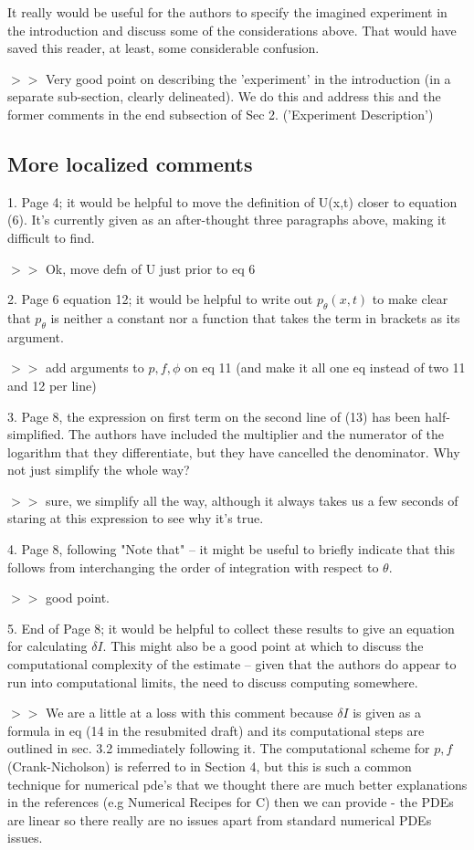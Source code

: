 \documentclass[12pt]{article}
\begin{document}
It really would be useful for the authors to specify the imagined experiment in
the introduction and discuss some of the considerations above. That would have
saved this reader, at least, some considerable confusion.

$>>$ Very good point on describing the 'experiment' in the introduction (in a
separate sub-section, clearly delineated). We do this and address
this and the former comments in the end subsection of Sec 2. ('Experiment
Description')

\subsection{More localized comments} 

1. Page 4; it would be helpful to move the definition of U(x,t) closer to
equation (6). It's currently given as an after-thought three paragraphs above,
making it difficult to find.

$>>$ Ok, move defn of U just prior to eq 6

2. Page 6 equation 12; it would be helpful to write out $p_{\theta}(x,t)$ to
make clear that $p_{\theta}$ is neither a constant nor a function that takes the
term in brackets as its argument.

$>>$ add arguments to $p,f,\phi$ on eq 11 (and make it all one eq instead of
two 11 and 12 per line)

3. Page 8, the expression on first term on the second line of (13) has been
half-simplified. The authors have included the multiplier and the numerator of
the logarithm that they differentiate, but they have cancelled the denominator.
Why not just simplify the whole way?

$>>$ sure, we simplify all the way, although it always takes us a few seconds of
staring at this expression to see why it's true. 

4. Page 8, following "Note that" -- it might be useful to briefly indicate that
this follows from interchanging the order of integration with respect to
$\theta$.

$>>$  good point. 

5. End of Page 8; it would be helpful to collect these results to give an
equation for calculating $\delta I$. This might also be a good point at which to
discuss the computational complexity of the estimate -- given that the authors
do appear to run into computational limits, the need to discuss computing
somewhere.

$>>$ We are a little at a loss with this comment because $\delta I$ is given as
a formula in eq (14 in the resubmited draft) and its computational steps are
outlined in sec. 3.2 immediately following it. The computational scheme for
$p,f$ (Crank-Nicholson) is referred to in Section 4, but this is such a common
technique for numerical pde's that we thought there are much better explanations in the
references (e.g Numerical Recipes for C) then we can provide - the PDEs are
linear so there really are no issues apart from standard numerical PDEs issues. 
\end{document}
